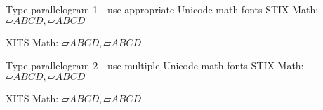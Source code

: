 \documentclass{article}
\begin{document}
\begin{example*}{Type parallelogram 1 - use appropriate Unicode math fonts}
  STIX Math: $ ▱ABCD, \parallelogram ABCD$ \par
  XITS Math: $ ▱ABCD, \parallelogram ABCD$
\end{example*}

\begin{example*}{Type parallelogram 2 - use multiple Unicode math fonts}
  STIX Math: $ ▱ABCD, \parallelogram ABCD$ \par
  XITS Math: $ ▱ABCD, \parallelogram ABCD$
\end{example*}
\end{document}
